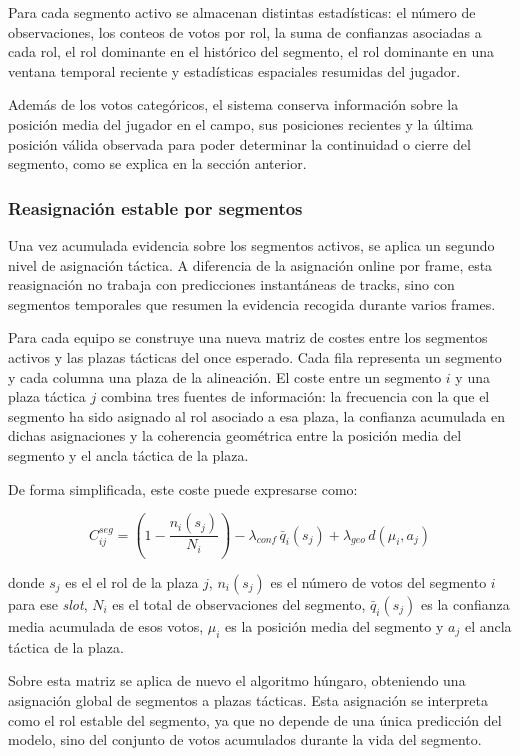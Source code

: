 Para cada segmento activo se almacenan distintas estadísticas: el número de observaciones, los conteos de votos por rol, la suma de confianzas asociadas a cada rol, el rol dominante en el histórico del segmento, el rol dominante en una ventana temporal reciente y estadísticas espaciales resumidas del jugador.

Además de los votos categóricos, el sistema conserva información sobre la posición media del jugador en el campo, sus posiciones recientes y la última posición válida observada para poder determinar la continuidad o cierre del segmento, como se explica en la sección anterior.

\subsubsection{Reasignación estable por segmentos}

Una vez acumulada evidencia sobre los segmentos activos, se aplica un segundo nivel de asignación táctica. A diferencia de la asignación online por frame, esta reasignación no trabaja con predicciones instantáneas de tracks, sino con segmentos temporales que resumen la evidencia recogida durante varios frames.

Para cada equipo se construye una nueva matriz de costes entre los segmentos activos y las plazas tácticas del once esperado. Cada fila representa un segmento y cada columna una plaza de la alineación. El coste entre un segmento \(i\) y una plaza táctica \(j\) combina tres fuentes de información: la frecuencia con la que el segmento ha sido asignado al rol asociado a esa plaza, la confianza acumulada en dichas asignaciones y la coherencia geométrica entre la posición media del segmento y el ancla táctica de la plaza.

De forma simplificada, este coste puede expresarse como:

\[
C^{seg}_{ij}
=
\left(1-\frac{n_i(s_j)}{N_i}\right)
-
\lambda_{conf}\,\bar{q}_i(s_j)
+
\lambda_{geo}\,d(\mu_i,a_j)
\]

donde \(s_j\) es el el rol de la plaza \(j\), \(n_i(s_j)\) es el número de votos del segmento \(i\) para ese \textit{slot}, \(N_i\) es el total de observaciones del segmento, \(\bar{q}_i(s_j)\) es la confianza media acumulada de esos votos, \(\mu_i\) es la posición media del segmento y \(a_j\) el ancla táctica de la plaza.

Sobre esta matriz se aplica de nuevo el algoritmo húngaro, obteniendo una asignación global de segmentos a plazas tácticas. Esta asignación se interpreta como el rol estable del segmento, ya que no depende de una única predicción del modelo, sino del conjunto de votos acumulados durante la vida del segmento.

